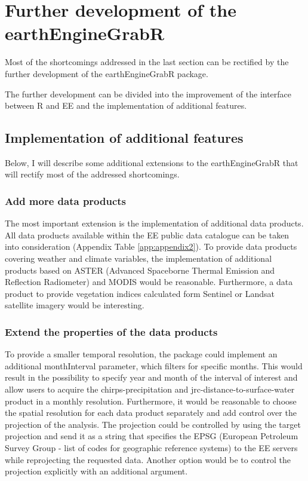 \section{Further development of the earthEngineGrabR}

Most of the shortcomings addressed in the last section can be rectified by the further development of the earthEngineGrabR package. 

The further development can be divided into the improvement of the interface between R and EE and the implementation of additional features.

\subsection{Implementation of additional features}

Below, I will describe some additional extensions to the earthEngineGrabR that will rectify most of the addressed shortcomings.

\subsubsection{Add more data products}

The most important extension is the implementation of additional data products. All data products available within the EE public data catalogue can be taken into consideration (Appendix Table \ref{app:appendix2}). To provide data products covering weather and climate variables, the implementation of additional products based on ASTER (Advanced Spaceborne Thermal Emission and Reflection Radiometer) and MODIS would be reasonable. Furthermore, a data product to provide vegetation indices calculated form Sentinel or Landsat satellite imagery would be interesting.

\subsubsection{Extend the properties of the data products}
To provide a smaller temporal resolution, the package could implement an additional monthInterval parameter, which filters for specific months. This would result in the possibility to specify year and month of the interval of interest and allow users to acquire the chirps-precipitation and jrc-distance-to-surface-water product in a monthly resolution.
Furthermore, it would be reasonable to choose the spatial resolution for each data product separately and add control over the projection of the analysis. 
The projection could be controlled by using the target projection and send it as a string that specifies the EPSG (European Petroleum Survey Group - list of codes for geographic reference systems) to the EE servers while reprojecting the requested data. Another option would be to control the projection explicitly with an additional argument.


